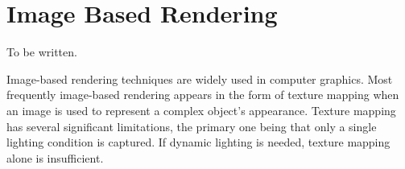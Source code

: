 % 
% 
\section{Image Based Rendering}
To be written.

Image-based rendering techniques are widely used in computer graphics.
Most frequently image-based rendering appears in the form of texture mapping 
when an image is used to represent a complex object's 
appearance. Texture mapping has several significant limitations, the primary one being that only a single lighting 
condition is captured. If dynamic lighting is needed, texture mapping alone is insufficient. 

